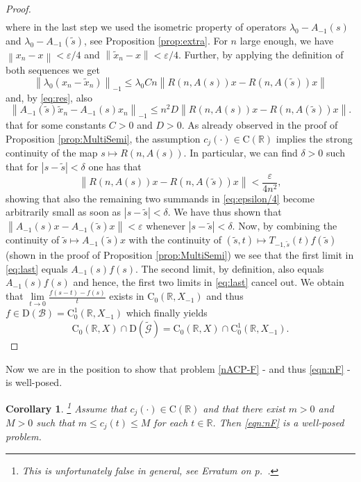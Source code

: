 \documentclass[a4paper,oneside,10pt]{amsart}
\newtheorem{corollary}[theorem]{Corollary}
\theoremstyle{definition}
\numberwithin{equation}{section}
\def\dom{\mathrm{D}}
\def\RR{\mathbb{R}}
\begin{document}
{\begin{proof}
{\begin{align}
\end{align}
where in the last step we used the isometric property of operators $\lambda_0-A_{-1}(s)$ and $\lambda_0-A_{-1}(\tilde{s})$, see Proposition \ref{prop:extra}.
For $n$ large enough, we have $\left\|x_n-x\right\|<\varepsilon/4$ and $\left\|\tilde{x}_n-x\right\|<\varepsilon/4$. 
Further, by applying the definition of both sequences we get
\[
\left\|\lambda_0 (x_n-\tilde{x}_n)\right\|_{-1}\leq\lambda_0 C n\left\|R(n,A(s))x-R(n,A(\tilde{s}))x\right\|
\]
and, by \eqref{eq:res}, also
\[
\left\|A_{-1}(\tilde{s})\tilde{x}_n-A_{-1}(s)x_n\right\|_{-1}\leq n^2 D\left\|R(n,A(s))x-R(n,A(\tilde{s}))x\right\|.
\]
that for some constants $C>0$ and $D>0$. 
As already observed in the proof of Proposition \ref{prop:MultiSemi}, the assumption $c_j(\cdot)\in\mathrm{C}(\RR)$ implies the strong continuity of the map $s\mapsto R(n,A(s))$. In particular, we can find $\delta>0$ such that for $\left|s-\tilde{s}\right|<\delta$ one has that
\[
\left\|R(n,A(s))x-R(n,A(\tilde{s}))x\right\|<\frac{\varepsilon}{4n^2},
\]
showing that also the remaining two summands in \eqref{eq:epsilon/4} become arbitrarily small as soon as $\left|s-\tilde{s}\right|<\delta$. We have thus shown that $\left\|A_{-1}(s)x-A_{-1}(\tilde{s})x\right\|<\varepsilon$ whenever $\left|s-\tilde{s}\right|<\delta$.} {Now, by combining the continuity of $\tilde{s}\mapsto A_{-1}(\tilde{s})x$ with the continuity of $(\tilde{s},t)\mapsto T_{-1,\tilde{s}}(t)f(\tilde{s})$ (shown in  the proof of Proposition \ref{prop:MultiSemi}) we see that the first limit in \eqref{eq:last} equals $A_{-1}(s)f(s)$. The second limit,  by definition, also equals $A_{-1}(s)f(s)$ and hence, the first two limits in  \eqref{eq:last}  cancel out.} We obtain that $\lim\limits_{t\to0}{\frac{f(s-t)-f(s)}{t}}$  exists in $\mathrm{C}_0(\RR,X_{-1})$ and thus $f\in\dom(\mathcal{B})=\mathrm{C}^1_0(\RR,X_{-1})$
which finally yields
\[
\mathrm{C}_0(\RR,X)\cap \dom(\widetilde{\mathcal{G}}) =\mathrm{C}_0(\RR,X)\cap\mathrm{C}^1_0(\RR,X_{-1}).
\]
 \end{proof}
}

Now we are in the position to show that  problem \eqref{nACP-F} - and thus \eqref{eqn:nF} - is well-posed.

\begin{corollary}\label{cor:WellPosnF}\footnote{This is unfortunately false in general, see Erratum on p.~\pageref{erratum}.}
Assume that $c_j(\cdot)\in\mathrm{C}(\RR)$ and that there exist {$m>0$ and $M>0$} such that $m\leq c_j(t)\leq M$ for each $t\in\RR$. Then \eqref{eqn:nF} is a well-posed problem. 
\end{corollary}
\end{document}
